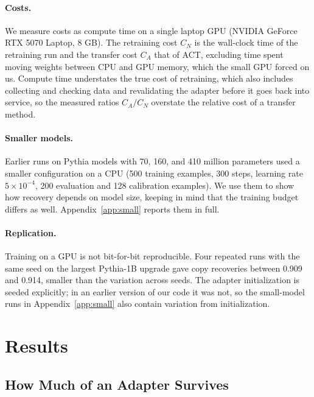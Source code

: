 \documentclass[ijds,blindrev]{informs4}
\begin{document}
\paragraph{Costs.} We measure costs as compute time on a single laptop GPU (NVIDIA GeForce RTX 5070 Laptop, 8 GB). The retraining cost $C_N$ is the wall-clock time of the retraining run and the transfer cost $C_A$ that of ACT, excluding time spent moving weights between CPU and GPU memory, which the small GPU forced on us. Compute time understates the true cost of retraining, which also includes collecting and checking data and revalidating the adapter before it goes back into service, so the measured ratios $C_A/C_N$ overstate the relative cost of a transfer method.

\paragraph{Smaller models.} Earlier runs on Pythia models with 70, 160, and 410 million parameters used a smaller configuration on a CPU (500 training examples, 300 steps, learning rate $5\times10^{-4}$, 200 evaluation and 128 calibration examples). We use them to show how recovery depends on model size, keeping in mind that the training budget differs as well. Appendix~\ref{app:small} reports them in full.

\paragraph{Replication.} Training on a GPU is not bit-for-bit reproducible. Four repeated runs with the same seed on the largest Pythia-1B upgrade gave copy recoveries between 0.909 and 0.914, smaller than the variation across seeds. The adapter initialization is seeded explicitly; in an earlier version of our code it was not, so the small-model runs in Appendix~\ref{app:small} also contain variation from initialization.

\section{Results}\label{sec:results}

\subsection{How Much of an Adapter Survives}\label{sec:survival}
\end{document}
